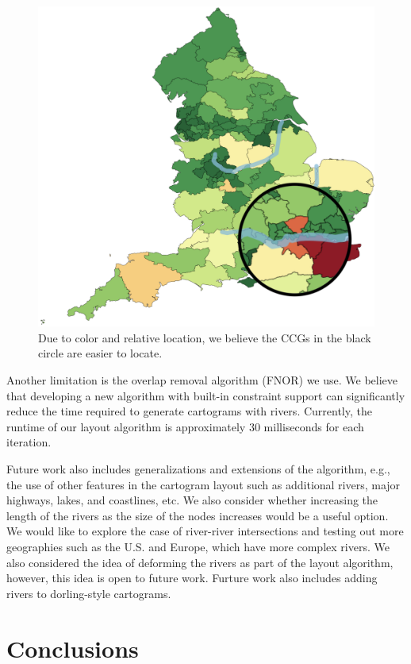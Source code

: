 \documentclass[Afour,sagev,times]{sagej}
\begin{document}
    {
        \begin{figure}[tb!]
            \centering
            \includegraphics[width=0.7\columnwidth,keepaspectratio]{extreme.png}
            \caption{Due to color and relative location, we believe the CCGs in the black circle are easier to locate.}
            \label{fig:extreme}
        \end{figure}
    }

Another limitation is the overlap removal algorithm (FNOR) we use.
We believe that developing a new algorithm with built-in constraint support can significantly reduce the time required to generate cartograms with rivers. Currently, the runtime of our layout algorithm is approximately 30 milliseconds for each iteration.

Future work also includes generalizations and extensions of the algorithm, e.g., the use of other features in the cartogram layout such as additional rivers, major highways, lakes, and coastlines, etc.
We also consider whether increasing the length of the rivers as the size of the nodes increases would be a useful option.
We would like to explore the case of river-river intersections and testing out more geographies such as the U.S. and Europe, which have more complex rivers.
We also considered the idea of deforming the rivers as part of the layout algorithm, however, this idea is open to future work.
Furture work also includes adding rivers to dorling-style cartograms.


\section{Conclusions}\label{sec:{Conclusions}}
\end{document}
